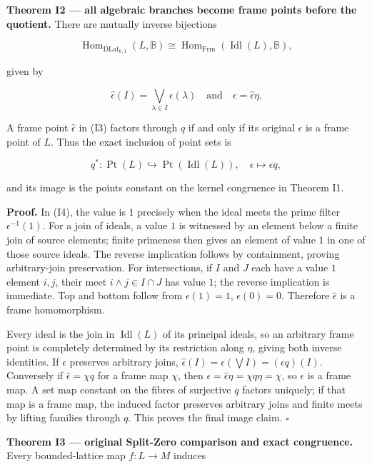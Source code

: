 \textbf{Theorem I2 --- all algebraic branches become frame points before the quotient.} There are mutually inverse bijections

\[
\operatorname{Hom}_{\mathrm{DLat}_{0,1}}(L,\mathbb B)
\cong\operatorname{Hom}_{\mathrm{Frm}}(\operatorname{Idl}(L),\mathbb B),
\tag{I3}
\]

given by

\[
\widehat\epsilon(I)=\bigvee_{\lambda\in I}\epsilon(\lambda)
\quad\text{and}\quad\epsilon=\widehat\epsilon\eta.
\tag{I4}
\]

A frame point \(\widehat\epsilon\) in (I3) factors through \(q\) if and only if its original \(\epsilon\) is a frame point of \(L\). Thus the exact inclusion of point sets is

\[
q^*:\operatorname{Pt}(L)\hookrightarrow\operatorname{Pt}(\operatorname{Idl}(L)),
\quad\epsilon\mapsto\epsilon q,
\tag{I5}
\]

and its image is the points constant on the kernel congruence in Theorem I1.

\textbf{Proof.} In (I4), the value is \(1\) precisely when the ideal meets the prime filter \(\epsilon^{-1}(1)\). For a join of ideals, a value \(1\) is witnessed by an element below a finite join of source elements; finite primeness then gives an element of value \(1\) in one of those source ideals. The reverse implication follows by containment, proving arbitrary-join preservation. For intersections, if \(I\) and \(J\) each have a value \(1\) element \(i,j\), their meet \(i\wedge j\in I\cap J\) has value \(1\); the reverse implication is immediate. Top and bottom follow from \(\epsilon (1)=1\), \(\epsilon (0)=0\). Therefore \(\widehat\epsilon\) is a frame homomorphism.

Every ideal is the join in \(\operatorname{Idl}(L)\) of its principal ideals, so an arbitrary frame point is completely determined by its restriction along \(\eta\), giving both inverse identities. If \(\epsilon\) preserves arbitrary joins, \(\widehat\epsilon(I)=\epsilon(\bigvee I)=(\epsilon q)(I)\). Conversely if \(\widehat\epsilon=\chi q\) for a frame map \(\chi\), then \(\epsilon=\widehat\epsilon\eta=\chi q\eta=\chi\), so \(\epsilon\) is a frame map. A set map constant on the fibres of surjective \(q\) factors uniquely; if that map is a frame map, the induced factor preserves arbitrary joins and finite meets by lifting families through \(q\). This proves the final image claim. \(\square\)

\textbf{Theorem I3 --- original Split-Zero comparison and exact congruence.} Every bounded-lattice map \(f:L\to M\) induces

